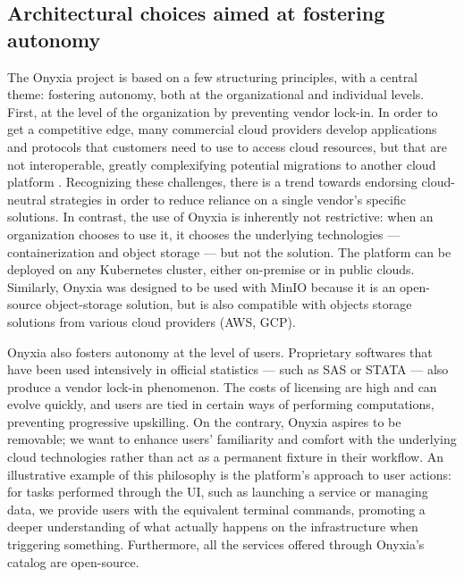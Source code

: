 \documentclass[graybox]{svmult}
\begin{document}
\subsection{Architectural choices aimed at fostering autonomy}
\label{ssec:principles}

The Onyxia project is based on a few structuring principles, with a central theme: fostering autonomy, both at the organizational and individual levels. First, at the level of the organization by preventing vendor lock-in. In order to get a competitive edge, many commercial cloud providers develop applications and protocols that customers need to use to access cloud resources, but that are not interoperable, greatly complexifying potential migrations to another cloud platform \cite{opara2016critical}. Recognizing these challenges, there is a trend towards endorsing cloud-neutral strategies \cite{opara2017holistic} in order to reduce reliance on a single vendor’s specific solutions. In contrast, the use of Onyxia is inherently not restrictive: when an organization chooses to use it, it chooses the underlying technologies — containerization and object storage — but not the solution. The platform can be deployed on any Kubernetes cluster, either on-premise or in public clouds. Similarly, Onyxia was designed to be used with MinIO because it is an open-source object-storage solution, but is also compatible with objects storage solutions from various cloud providers (AWS, GCP).

Onyxia also fosters autonomy at the level of users. Proprietary softwares that have been used intensively in official statistics — such as SAS or STATA — also produce a vendor lock-in phenomenon. The costs of licensing are high and can evolve quickly, and users are tied in certain ways of performing computations, preventing progressive upskilling. On the contrary, Onyxia aspires to be removable; we want to enhance users' familiarity and comfort with the underlying cloud technologies rather than act as a permanent fixture in their workflow. An illustrative example of this philosophy is the platform's approach to user actions: for tasks performed through the UI, such as launching a service or managing data, we provide users with the equivalent terminal commands, promoting a deeper understanding of what actually happens on the infrastructure when triggering something. Furthermore, all the services offered through Onyxia's catalog are open-source.
\end{document}
